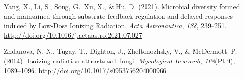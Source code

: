 \documentclass[12pt,twoside]{reedthesis}
\begin{document}
\leavevmode\hypertarget{ref-yang_microbial_2021}{}%
Yang, X., Li, S., Song, G., Xu, X., \& Hu, D. (2021). Microbial diversity formed and maintained through substrate feedback regulation and delayed responses induced by Low-Dose Ionizing Radiation. \emph{Acta Astronautica}, \emph{188}, 239--251. \url{http://doi.org/10.1016/j.actaastro.2021.07.027}

\leavevmode\hypertarget{ref-zhdanova_ionizing_2004}{}%
Zhdanova, N. N., Tugay, T., Dighton, J., Zheltonozhsky, V., \& McDermott, P. (2004). Ionizing radiation attracts soil fungi. \emph{Mycological Research}, \emph{108}(Pt 9), 1089--1096. \url{http://doi.org/10.1017/s0953756204000966}


\end{document}
